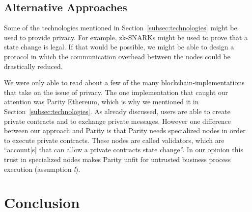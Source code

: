 \documentclass[runningheads]{llncs}
\newcommand{\comment}[1]{}
\newcommand{\ber}[1]{\textit{#1}}
\newcommand{\refsec}[1]{Section~\ref{#1}}
\newcommand{\quotel}{``}
\newcommand{\quoter}{''}
\begin{document}
\subsection{Alternative Approaches}

Some of the technologies mentioned in \refsec{subsec:technologies} might be used to provide privacy. For example, zk-SNARKs might be used to prove that a state change is legal. If that would be possible, we might be able to design a protocol in which the communication overhead between the nodes could be drastically reduced. 


We were only able to read about a few of the many block\-chain-im\-ple\-men\-ta\-tions that take on the issue of privacy. The one implementation that caught our attention was Parity Ethereum, which is why we mentioned it in \refsec{subsec:technologies}. As already discussed, users are able to create private contracts and to exchange private messages. However one difference between our approach and Parity is that Parity needs specialized nodes in order to execute private contracts. These nodes are called validators, which are \quotel account[s] that can allow a private contracts state change\quoter  \cite{parity}. In our opinion this trust in specialized nodes makes Parity unfit for untrusted business process execution (assumption \ber{l}).

\comment{
We would also like to mention Parity Ethereum. With Parity, users are able to hide private contracts in public contracts  and to exchange private messages. However for private contract execution Parity is relying on validators, \quotel account[s] that can allow a private contract's state change\quoter  \cite{parity}. In our understanding this makes Parity unfit for for untrusted business process execution, since, like private blockchains, it requires trust in one or multiple nodes.

\todo{Parity comparison}
}
\section{Conclusion} \label{sec:conclusion}

\comment{
\begin{itemize}
    \item How could mentioned in \refsec{subsec:technologies} improve \refsec{sec:eval}?
    \item How did it work out in the end? 
\end{itemize}}
\end{document}
